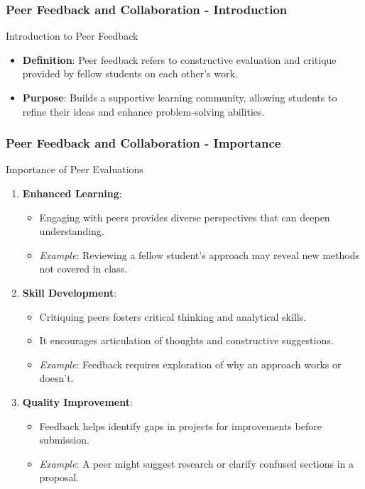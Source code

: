 \documentclass{beamer}
\begin{document}
\begin{frame}[fragile]
    \frametitle{Peer Feedback and Collaboration - Introduction}
    \begin{block}{Introduction to Peer Feedback}
        \begin{itemize}
            \item \textbf{Definition}: Peer feedback refers to constructive evaluation and critique provided by fellow students on each other’s work.
            \item \textbf{Purpose}: Builds a supportive learning community, allowing students to refine their ideas and enhance problem-solving abilities.
        \end{itemize}
    \end{block}
\end{frame}

\begin{frame}[fragile]
    \frametitle{Peer Feedback and Collaboration - Importance}
    \begin{block}{Importance of Peer Evaluations}
        \begin{enumerate}
            \item \textbf{Enhanced Learning}:
                \begin{itemize}
                    \item Engaging with peers provides diverse perspectives that can deepen understanding.
                    \item \textit{Example}: Reviewing a fellow student's approach may reveal new methods not covered in class.
                \end{itemize}
            \item \textbf{Skill Development}:
                \begin{itemize}
                    \item Critiquing peers fosters critical thinking and analytical skills.
                    \item It encourages articulation of thoughts and constructive suggestions.
                    \item \textit{Example}: Feedback requires exploration of why an approach works or doesn’t.
                \end{itemize}
            \item \textbf{Quality Improvement}:
                \begin{itemize}
                    \item Feedback helps identify gaps in projects for improvements before submission.
                    \item \textit{Example}: A peer might suggest research or clarify confused sections in a proposal.
                \end{itemize}
        \end{enumerate}
    \end{block}
\end{frame}
\end{document}
